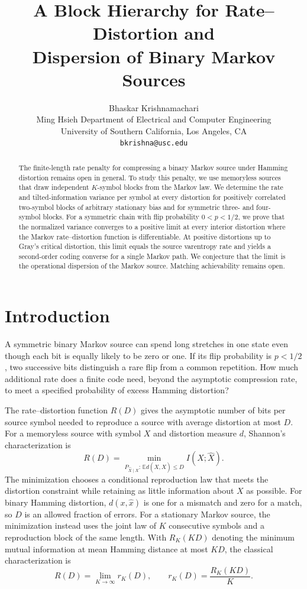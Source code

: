 \documentclass[11pt,letterpaper]{article}
\title{\bfseries A Block Hierarchy for Rate--Distortion and\\Dispersion of Binary Markov Sources}
\author{Bhaskar Krishnamachari\\[3pt]
\small Ming Hsieh Department of Electrical and Computer Engineering\\[-2pt]
\small University of Southern California, Los Angeles, CA\\[-2pt]
\small\texttt{bkrishna@usc.edu}}
\date{}
\theoremstyle{definition}
\newcommand{\E}{\mathbb E}
\begin{document}
\maketitle


\begin{abstract}
The finite-length rate penalty for compressing a binary Markov source under Hamming distortion remains open in general. To study this penalty, we use memoryless sources that draw independent $K$-symbol blocks from the Markov law. We determine the rate and tilted-information variance per symbol at every distortion for positively correlated two-symbol blocks of arbitrary stationary bias and for symmetric three- and four-symbol blocks. For a symmetric chain with flip probability $0<p<1/2$, we prove that the normalized variance converges to a positive limit at every interior distortion where the Markov rate--distortion function is differentiable. At positive distortions up to Gray's critical distortion, this limit equals the source varentropy rate and yields a second-order coding converse for a single Markov path. We conjecture that the limit is the operational dispersion of the Markov source. Matching achievability remains open.
\end{abstract}

\section{Introduction}
A symmetric binary Markov source can spend long stretches in one state even though each bit is equally likely to be zero or one. If its flip probability is $p<1/2$, two successive bits distinguish a rare flip from a common repetition. How much additional rate does a finite code need, beyond the asymptotic compression rate, to meet a specified probability of excess Hamming distortion?

The rate--distortion function $R(D)$ gives the asymptotic number of bits per source symbol needed to reproduce a source with average distortion at most $D$. For a memoryless source with symbol $X$ and distortion measure $d$, Shannon's characterization is
\[
 R(D)=\min_{P_{\hat X\mid X}:\,\E d(X,\hat X)\le D} I(X;\hat X).
\]
The minimization chooses a conditional reproduction law that meets the distortion constraint while retaining as little information about $X$ as possible. For binary Hamming distortion, $d(x,\hat x)$ is one for a mismatch and zero for a match, so $D$ is an allowed fraction of errors. For a stationary Markov source, the minimization instead uses the joint law of $K$ consecutive symbols and a reproduction block of the same length. With $R_K(KD)$ denoting the minimum mutual information at mean Hamming distance at most $KD$, the classical characterization is \cite{berger71,gray71,wynerziv}
\[
       R(D)=\lim_{K\to\infty}r_K(D),\qquad r_K(D)=\frac{R_K(KD)}{K}.
\]
\end{document}
